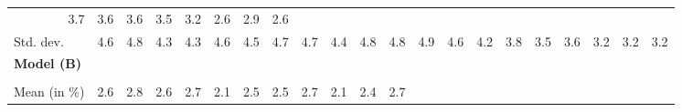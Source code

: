 \begin{tabular}{lllllllllllllllllllll}
  \multicolumn{1}{r}{3.7} &
  \multicolumn{1}{r}{3.6} &
  \multicolumn{1}{r}{3.6} &
  \multicolumn{1}{r}{3.5} &
  \multicolumn{1}{r}{3.2} &
  \multicolumn{1}{r}{2.6} &
  \multicolumn{1}{r}{2.9} &
  \multicolumn{1}{r}{2.6} \\
\multicolumn{1}{l}{\hspace{2em}Std. dev.} &
  \multicolumn{1}{|r}{4.6} &
  \multicolumn{1}{r}{4.8} &
  \multicolumn{1}{r}{4.3} &
  \multicolumn{1}{r}{4.3} &
  \multicolumn{1}{r}{4.6} &
  \multicolumn{1}{r}{4.5} &
  \multicolumn{1}{r}{4.7} &
  \multicolumn{1}{r}{4.7} &
  \multicolumn{1}{r}{4.4} &
  \multicolumn{1}{r}{4.8} &
  \multicolumn{1}{r}{4.8} &
  \multicolumn{1}{r}{4.9} &
  \multicolumn{1}{r}{4.6} &
  \multicolumn{1}{r}{4.2} &
  \multicolumn{1}{r}{3.8} &
  \multicolumn{1}{r}{3.5} &
  \multicolumn{1}{r}{3.6} &
  \multicolumn{1}{r}{3.2} &
  \multicolumn{1}{r}{3.2} &
  \multicolumn{1}{r}{3.2} \\
\multicolumn{1}{l}{{\textbf{Model (B)}}} &
  \multicolumn{1}{|r}{} &
  \multicolumn{1}{r}{} &
  \multicolumn{1}{r}{} &
  \multicolumn{1}{r}{} &
  \multicolumn{1}{r}{} &
  \multicolumn{1}{r}{} &
  \multicolumn{1}{r}{} &
  \multicolumn{1}{r}{} &
  \multicolumn{1}{r}{} &
  \multicolumn{1}{r}{} &
  \multicolumn{1}{r}{} &
  \multicolumn{1}{r}{} &
  \multicolumn{1}{r}{} &
  \multicolumn{1}{r}{} &
  \multicolumn{1}{r}{} &
  \multicolumn{1}{r}{} &
  \multicolumn{1}{r}{} &
  \multicolumn{1}{r}{} &
  \multicolumn{1}{r}{} &
  \multicolumn{1}{r}{} \\
\multicolumn{1}{l}{\hspace{1em}{\textit{Multiplicative term} ($\widehat{\tau}^{adv}$)}} &
  \multicolumn{1}{|r}{} &
  \multicolumn{1}{r}{} &
  \multicolumn{1}{r}{} &
  \multicolumn{1}{r}{} &
  \multicolumn{1}{r}{} &
  \multicolumn{1}{r}{} &
  \multicolumn{1}{r}{} &
  \multicolumn{1}{r}{} &
  \multicolumn{1}{r}{} &
  \multicolumn{1}{r}{} &
  \multicolumn{1}{r}{} &
  \multicolumn{1}{r}{} &
  \multicolumn{1}{r}{} &
  \multicolumn{1}{r}{} &
  \multicolumn{1}{r}{} &
  \multicolumn{1}{r}{} &
  \multicolumn{1}{r}{} &
  \multicolumn{1}{r}{} &
  \multicolumn{1}{r}{} &
  \multicolumn{1}{r}{} \\
\multicolumn{1}{l}{\hspace{2em}Mean (in $\%$)} &
  \multicolumn{1}{|r}{2.6} &
  \multicolumn{1}{r}{2.8} &
  \multicolumn{1}{r}{2.6} &
  \multicolumn{1}{r}{2.7} &
  \multicolumn{1}{r}{2.1} &
  \multicolumn{1}{r}{2.5} &
  \multicolumn{1}{r}{2.5} &
  \multicolumn{1}{r}{2.7} &
  \multicolumn{1}{r}{2.1} &
  \multicolumn{1}{r}{2.4} &
  \multicolumn{1}{r}{2.7} &

\end{tabular}
